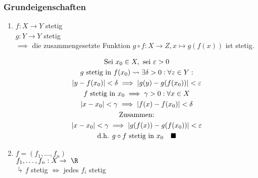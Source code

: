 \subsubsection{Grundeigenschaften}
\begin{enumerate}[label=(\alph*)]
	\item
		$f: X \rightarrow Y$ stetig \\
		$g: Y \rightarrow Y$ stetig \\
		$\implies$ die zusammengesetzte Funktion $g \circ f: X \rightarrow Z , x \mapsto g(f(x))$ ist stetig.\\
		\begin{bew}
			\begin{gather*}
				\text{Sei } x_0 \in X, \text{ sei } \epsilon > 0 \\
				g \text{ stetig in } f(x_0) \rightsquigarrow \exists \delta > 0 : \forall z \in Y: \\
				\abs{y - f(x_0)} < \delta \implies \abs{g(y) - g(f(x_0))} < \epsilon \\
				f \text{ stetig in } x_0 \implies \gamma > 0 : \forall x \in X \\
				\abs{x - x_0} < \gamma \implies \abs{f(x) - f(x_0)} < \delta \\
				\text{Zusammen:} \\
				\abs{x - x_0} < \gamma \implies \abs{g(f(x)) - g(f(x_0))} < \epsilon \\
				\text{d.h. } g \circ f \text{ stetig in } x_0 \quad \blacksquare
			\end{gather*}
		\end{bew}
	\item
		$f = (f_1 , \dotsc , f_n)$\\
		$f_1 , \dotsc , f_n : X \rightarrow \R$\\
		$\drsh f$ stetig $\iff$ jedes $f_i$ stetig
	

\end{enumerate}
